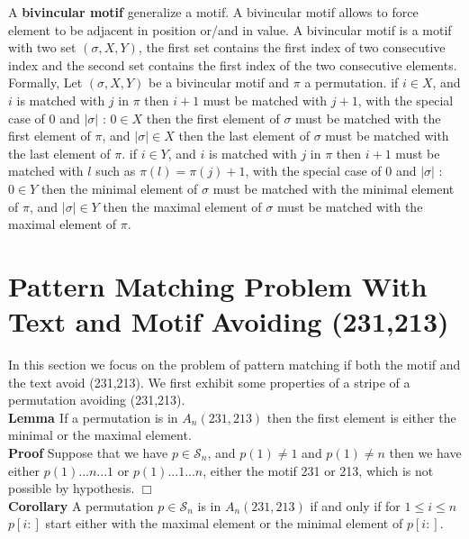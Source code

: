 \documentclass[12pt, a4paper]{article}
\newcommand{\C}[1]{A_{#1}(231,213)}
\newcommand{\Perm}[1]{\mathcal{S}_{#1}}
\newcommand{\ptext}{\pi}
\newcommand{\pmotif}{\sigma}
\newcommand{\x}{X}
\newcommand{\y}{Y}
\newcommand{\bmotif}{(\sigma,\x,\y)}
\newcounter{num}
\newcommand{\num}{\stepcounter{num} }
\newcommand{\numl}[1]{\refstepcounter{num}\label{#1}}
\begin{document}
		A \textbf{bivincular motif} generalize
		a motif. 
		A bivincular motif allows 
		to force element to be adjacent in position
		or/and in value.
		A bivincular motif
		is a motif with two set $\bmotif$,
		the first set contains the first index 
		of two consecutive index
		and the second set contains the first index
		of the two consecutive elements.
		Formally, Let $\bmotif$ 
		be a bivincular motif 
		and $\ptext$ a permutation.
		if $i \in \x$,
		and $i$ is matched with $j$ in $\ptext$
		then $i+1$ must be matched with $j+1$,
		with the special case of $0$ and $|\pmotif|$ :
		$0 \in \x$ then the first element of $\pmotif$
		must be matched with the first element of $\ptext$,
		and $|\pmotif| \in \x$ then the last element of $\pmotif$
		must be matched with the last element of $\ptext$.
		if $i \in \y$,
		and $i$ is matched with $j$ in $\ptext$
		then $i+1$ must be matched with $l$
		such as $\ptext(l)=\ptext(j)+1$,
		with the special case of $0$ and $|\pmotif|$ :
		$0 \in \y$ then the minimal element of $\pmotif$
		must be matched with the minimal element of $\ptext$,
		and $|\pmotif| \in \y$ then the maximal element of $\pmotif$
		must be matched with the maximal element of $\ptext$.		
			
	\section{Pattern Matching Problem With Text and Motif Avoiding (231,213)}

		In this section we focus 
		on the problem of pattern matching if
		both the motif and the text
		avoid (231,213).
		We first exhibit some properties of a stripe 
		of a permutation avoiding (231,213).\\

		\textbf{Lemma  \numl{firstelement} \thenum} If a permutation is in $\C{n}$ 
		then the first element is either
		the minimal or the maximal element.\\
		
		\textbf{Proof} Suppose that we have
		$p \in \mathcal{S}_{n}$, and
		$p(1) \neq 1 $ and $p(1) \neq n$ then we have either
		$p(1) ... n ... 1$ or $p(1) ... 1 ... n $, either the motif 231 or 213, which is not possible by hypothesis. $\Box$\\
		
		\textbf{Corollary  \num \thenum} A permutation $p \in \Perm{n}$ is in $\C{n}$ if and only if for $1 \leq i \leq n$ 
		$p[i:]$ start either with the maximal element
		or the minimal element of $p[i:]$.\\
	
\end{document}

